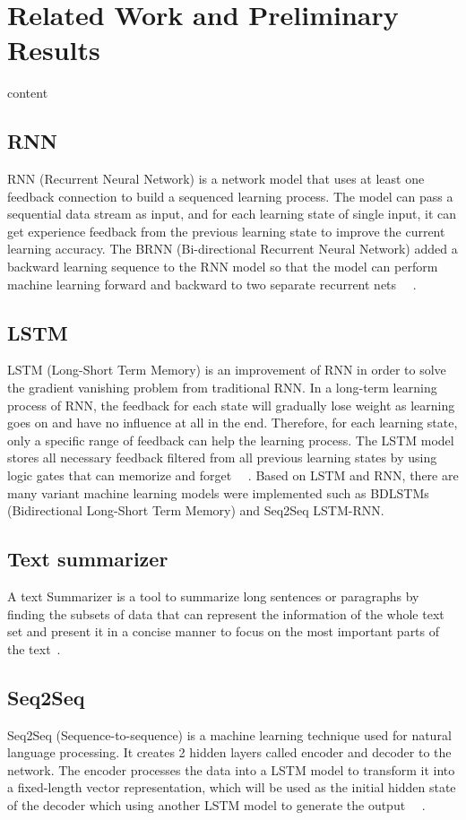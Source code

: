 \documentclass[conference]{IEEEtran}
\begin{document}
\section{Related Work and Preliminary Results}
content 
\subsection{RNN}
RNN (Recurrent Neural Network) is a network model that uses at least one feedback connection to build a sequenced learning process. The model can pass a sequential data stream as input, and for each learning state of single input, it can get experience feedback from the previous learning state to improve the current learning accuracy. The BRNN (Bi-directional Recurrent Neural Network) added a backward learning sequence to the RNN model so that the model can perform machine learning forward and backward to two separate recurrent nets ~\cite{vu2016bi}~\cite{schuster1997bidirectional}. 
\subsection{LSTM}
LSTM (Long-Short Term Memory) is an improvement of RNN in order to solve the gradient vanishing problem from traditional RNN. In a long-term learning process of RNN, the feedback for each state will gradually lose weight as learning goes on and have no influence at all in the end. Therefore, for each learning state, only a specific range of feedback can help the learning process. The LSTM model stores all necessary feedback filtered from all previous learning states by using logic gates that can memorize and forget ~\cite{hochreiter1997long}~\cite{gers2000learning}. Based on LSTM and RNN, there are many variant machine learning models were implemented such as BDLSTMs (Bidirectional Long-Short Term Memory) and Seq2Seq LSTM-RNN. 
\subsection{Text summarizer}
A text Summarizer is a tool to summarize long sentences or paragraphs by finding the subsets of data that can represent the information of the whole text set and present it in a concise manner to focus on the most important parts of the text~\cite{sinha2018extractive}. 
\subsection{Seq2Seq}
Seq2Seq (Sequence-to-sequence) is a machine learning technique used for natural language processing. It creates 2 hidden layers called encoder and decoder to the network. The encoder processes the data into a LSTM model to transform it into a fixed-length vector representation, which will be used as the initial hidden state of the decoder which using another LSTM model to generate the output ~\cite{sutskever2014sequence}~\cite{vinyals2015show}. 
\end{document}
